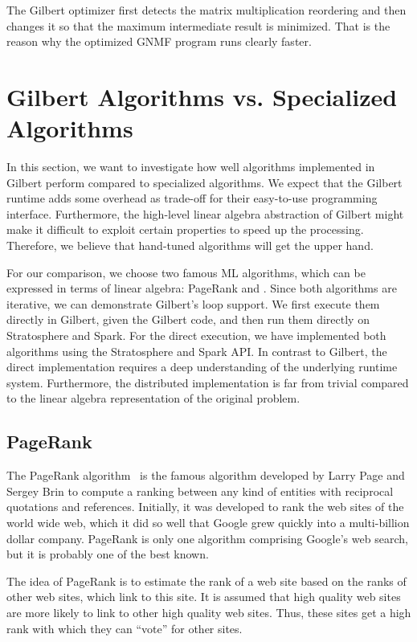 The Gilbert optimizer first detects the matrix multiplication reordering and then changes it so that the maximum intermediate result is minimized.
That is the reason why the optimized GNMF program runs clearly faster.

\section{Gilbert Algorithms vs. Specialized Algorithms}

In this section, we want to investigate how well algorithms implemented in Gilbert perform compared to specialized algorithms.
We expect that the Gilbert runtime adds some overhead as trade-off for their easy-to-use programming interface.
Furthermore, the high-level linear algebra abstraction of Gilbert might make it difficult to exploit certain properties to speed up the processing.
Therefore, we believe that hand-tuned algorithms will get the upper hand.

For our comparison, we choose two famous ML algorithms, which can be expressed in terms of linear algebra: PageRank and \kmeans.
Since both algorithms are iterative, we can demonstrate Gilbert's loop support.
We first execute them directly in Gilbert, given the Gilbert code, and then run them directly on Stratosphere and Spark.
For the direct execution, we have implemented both algorithms using the Stratosphere and Spark API.
In contrast to Gilbert, the direct implementation requires a deep understanding of the underlying runtime system.
Furthermore, the distributed implementation is far from trivial compared to the linear algebra representation of the original problem.

\subsection{PageRank}

The PageRank algorithm~\cite{page:1999a} is the famous algorithm developed by Larry Page and Sergey Brin to compute a ranking between any kind of entities with reciprocal quotations and references.
Initially, it was developed to rank the web sites of the world wide web, which it did so well that Google grew quickly into a multi-billion dollar company.
PageRank is only one algorithm comprising Google's web search, but it is probably one of the best known.

The idea of PageRank is to estimate the rank of a web site based on the ranks of other web sites, which link to this site.
It is assumed that high quality web sites are more likely to link to other high quality web sites.
Thus, these sites get a high rank with which they can ``vote'' for other sites.

